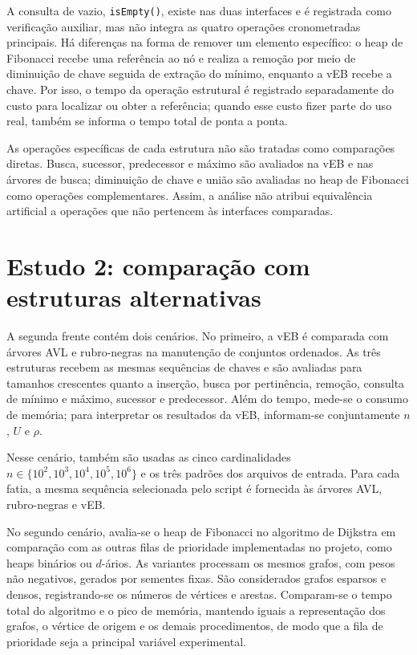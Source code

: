 \documentclass[12pt,a4paper]{report}
\begin{document}
A consulta de vazio, \texttt{isEmpty()}, existe nas duas interfaces e é registrada como verificação auxiliar, mas não integra as quatro operações cronometradas principais. Há diferenças na forma de remover um elemento específico: o heap de Fibonacci recebe uma referência ao nó e realiza a remoção por meio de diminuição de chave seguida de extração do mínimo, enquanto a vEB recebe a chave. Por isso, o tempo da operação estrutural é registrado separadamente do custo para localizar ou obter a referência; quando esse custo fizer parte do uso real, também se informa o tempo total de ponta a ponta.

As operações específicas de cada estrutura não são tratadas como comparações diretas. Busca, sucessor, predecessor e máximo são avaliados na vEB e nas árvores de busca; diminuição de chave e união são avaliadas no heap de Fibonacci como operações complementares. Assim, a análise não atribui equivalência artificial a operações que não pertencem às interfaces comparadas.

\section{Estudo 2: comparação com estruturas alternativas}

A segunda frente contém dois cenários. No primeiro, a vEB é comparada com árvores AVL e rubro-negras na manutenção de conjuntos ordenados. As três estruturas recebem as mesmas sequências de chaves e são avaliadas para tamanhos crescentes quanto a inserção, busca por pertinência, remoção, consulta de mínimo e máximo, sucessor e predecessor. Além do tempo, mede-se o consumo de memória; para interpretar os resultados da vEB, informam-se conjuntamente \(n\), \(U\) e \(\rho\).

Nesse cenário, também são usadas as cinco cardinalidades \(n\in\{10^2,\allowbreak 10^3,\allowbreak 10^4,\allowbreak 10^5,\allowbreak 10^6\}\) e os três padrões dos arquivos de entrada. Para cada fatia, a mesma sequência selecionada pelo script é fornecida às árvores AVL, rubro-negras e vEB.

No segundo cenário, avalia-se o heap de Fibonacci no algoritmo de Dijkstra em comparação com as outras filas de prioridade implementadas no projeto, como heaps binários ou \(d\)-ários. As variantes processam os mesmos grafos, com pesos não negativos, gerados por sementes fixas. São considerados grafos esparsos e densos, registrando-se os números de vértices e arestas. Comparam-se o tempo total do algoritmo e o pico de memória, mantendo iguais a representação dos grafos, o vértice de origem e os demais procedimentos, de modo que a fila de prioridade seja a principal variável experimental.
\end{document}
